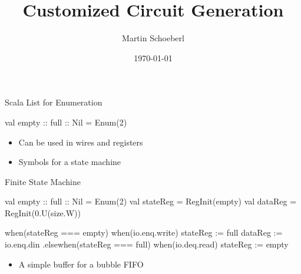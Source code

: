 

\newif\ifbook



\title{Customized Circuit Generation}
\author{Martin Schoeberl}
\date{\today}



\begin{frame}
\titlepage
\end{frame}





\begin{frame}[fragile]{Scala List for Enumeration}
\begin{chisel}
  val empty :: full :: Nil = Enum(2)
\end{chisel}
\begin{itemize}
\item Can be used in wires and registers
\item Symbols for a state machine
\end{itemize}
\end{frame}

\begin{frame}[fragile]{Finite State Machine}
\begin{chisel}
  val empty :: full :: Nil = Enum(2)
  val stateReg = RegInit(empty)
  val dataReg = RegInit(0.U(size.W))

  when(stateReg === empty) {
    when(io.enq.write) {
      stateReg := full
      dataReg := io.enq.din
    }
  }.elsewhen(stateReg === full) {
    when(io.deq.read) {
      stateReg := empty
    }
  }
\end{chisel}
\begin{itemize}
\item A simple buffer for a bubble FIFO
\end{itemize}
\end{frame}

